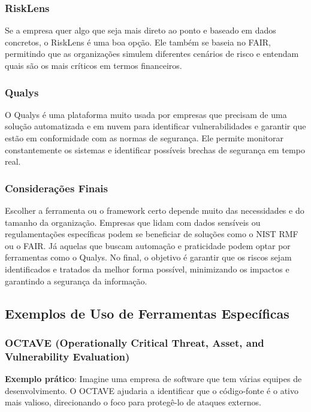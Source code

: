 \documentclass[12pt,oneside,a4paper,article]{abntex2}
\begin{document}
{\subsubsection{ \textbf{RiskLens}}

Se a empresa quer algo que seja mais direto ao ponto e baseado em dados concretos, o RiskLens é uma boa opção. Ele também se baseia no FAIR, permitindo que as organizações simulem diferentes cenários de risco e entendam quais são os mais críticos em termos financeiros.

\subsubsection{ \textbf{Qualys}}

O Qualys é uma plataforma muito usada por empresas que precisam de uma solução automatizada e em nuvem para identificar vulnerabilidades e garantir que estão em conformidade com as normas de segurança. Ele permite monitorar constantemente os sistemas e identificar possíveis brechas de segurança em tempo real.

\subsubsection{Considerações Finais}

Escolher a ferramenta ou o framework certo depende muito das necessidades e do tamanho da organização. Empresas que lidam com dados sensíveis ou regulamentações específicas podem se beneficiar de soluções como o NIST RMF ou o FAIR. Já aquelas que buscam automação e praticidade podem optar por ferramentas como o Qualys. No final, o objetivo é garantir que os riscos sejam identificados e tratados da melhor forma possível, minimizando os impactos e garantindo a segurança da informação.

 
}
\subsection{{Exemplos de Uso de Ferramentas Específicas}}
\subsubsection{\textbf{OCTAVE (Operationally Critical Threat, Asset, and Vulnerability Evaluation)}}
\textbf{Exemplo prático}: Imagine uma empresa de software que tem várias equipes de desenvolvimento. O OCTAVE ajudaria a identificar que o código-fonte é o ativo mais valioso, direcionando o foco para protegê-lo de ataques externos.
\end{document}
